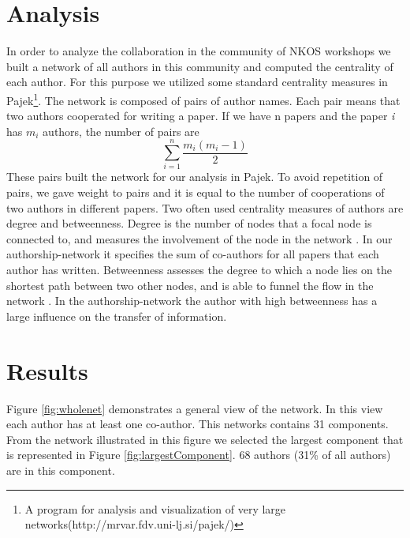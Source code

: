 \documentclass[runningheads,a4paper]{llncs}
\begin{document}


\section{Analysis}\label{analysis}

In order to analyze the collaboration in the community of NKOS workshops we built a network of all authors in this community and computed the centrality of each author. For this purpose we utilized some standard centrality measures in Pajek\footnote{A program for analysis and visualization of very large networks(http://mrvar.fdv.uni-lj.si/pajek/)}. The network is composed of pairs of author names. Each pair means that two authors cooperated for writing a paper. If we have n papers and the paper \textit{i} has $m_i$ authors, the number of pairs are %
\begin{equation}\sum\limits_{i=1}^n \frac{m_i(m_i-1)}{2}\end{equation}
These pairs built the network for our analysis in Pajek. To avoid repetition of pairs, we gave weight to pairs and it is equal to the number of cooperations of two authors in different papers. 
Two often used centrality measures of authors are degree and betweenness. Degree is the number of nodes that a focal node is connected to, and measures the involvement of the node in the network \cite{Opsahl2010}. In our authorship-network it specifies the sum of co-authors for all papers that each author has written. Betweenness assesses the degree to which a node lies on the shortest path between two other nodes, and is able to funnel the flow in the network \cite{Opsahl2010}. In the authorship-network the author with high betweenness has a large influence on the transfer of information. 


\section{Results}\label{results}

Figure \ref{fig:wholenet} demonstrates a general view of the network. In this view each author has at least one co-author. This networks contains 31 components. From the network illustrated in this figure we selected the largest component that is represented in Figure \ref{fig:largestComponent}. 68 authors (31\% of all authors) are in this component.
\end{document}
